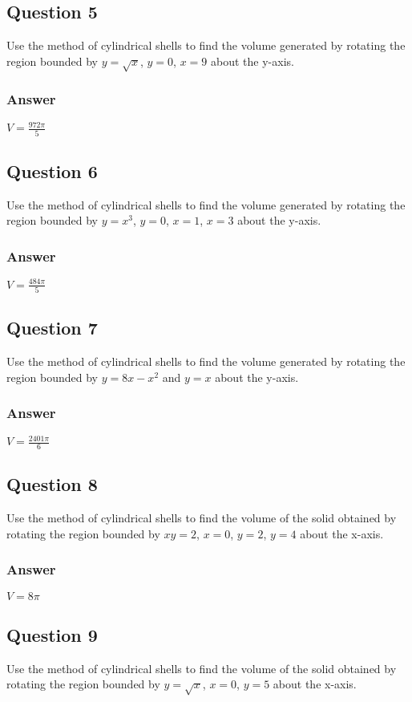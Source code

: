 \documentclass{article}
\begin{document}
\subsection*{Question 5}
Use the method of cylindrical shells to find the volume generated by rotating the region bounded by $y=\sqrt{x}$, $y=0$, $x=9$ about the y-axis.
\subsubsection*{Answer}
$ V = \frac{972\pi}{5} $

\subsection*{Question 6}
Use the method of cylindrical shells to find the volume generated by rotating the region bounded by $y=x^3$, $y=0$, $x=1$, $x=3$ about the y-axis.
\subsubsection*{Answer}
$ V = \frac{484\pi}{5} $

\subsection*{Question 7}
Use the method of cylindrical shells to find the volume generated by rotating the region bounded by $y=8x-x^2$ and $y=x$ about the y-axis.
\subsubsection*{Answer}
$ V = \frac{2401\pi}{6} $

\subsection*{Question 8}
Use the method of cylindrical shells to find the volume of the solid obtained by rotating the region bounded by $xy=2$, $x=0$, $y=2$, $y=4$ about the x-axis.
\subsubsection*{Answer}
$ V = 8\pi $

\subsection*{Question 9}
Use the method of cylindrical shells to find the volume of the solid obtained by rotating the region bounded by $y=\sqrt{x}$, $x=0$, $y=5$ about the x-axis.
\end{document}
